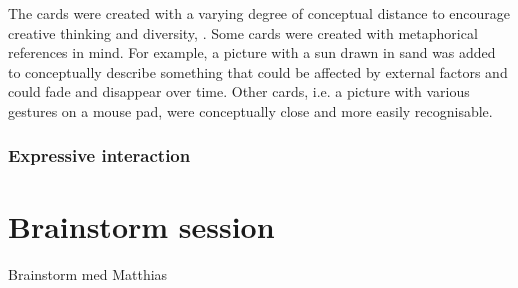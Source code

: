 The cards were created with a varying degree of conceptual distance to encourage creative thinking and diversity, \citep[chap. 10]{benyon2005designing}.
Some cards were created with metaphorical references in mind.
For example, a picture with a sun drawn in sand was added to conceptually describe something that could be affected by external factors and could fade and disappear over time.
Other cards, i.e. a picture with various gestures on a mouse pad, were conceptually close and more easily recognisable.

\subsubsection{Expressive interaction}


\section{Brainstorm session}
Brainstorm med Matthias


